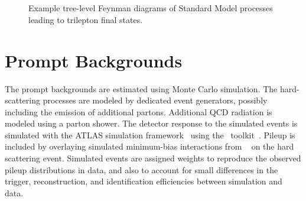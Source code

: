 \begin{figure}[p]
{	} \\
	 \\
	\caption{Example tree-level Feynman diagrams of Standard Model processes leading to trilepton final states.}
	\label{fig:multilepton-feynman-diagrams}
\end{figure}


\section{Prompt Backgrounds}\label{sec:prompt-backgrounds}
The prompt backgrounds are estimated using Monte Carlo simulation. The hard-scattering processes are modeled by dedicated event generators, possibly including the emission of additional partons. Additional QCD radiation is modeled using a parton shower. The detector response to the simulated events is simulated with the ATLAS simulation framework~\cite{TheATLASCollaboration:2010et} using the \geant\ toolkit~\cite{Agostinelli:2002hh}. Pileup is included by overlaying simulated minimum-bias interactions from \pythia~\cite{pythia6} on the hard scattering event. Simulated events are assigned weights to reproduce the observed pileup distributions in data, and also to account for small differences in the trigger, reconstruction, and identification efficiencies between simulation and data. 

